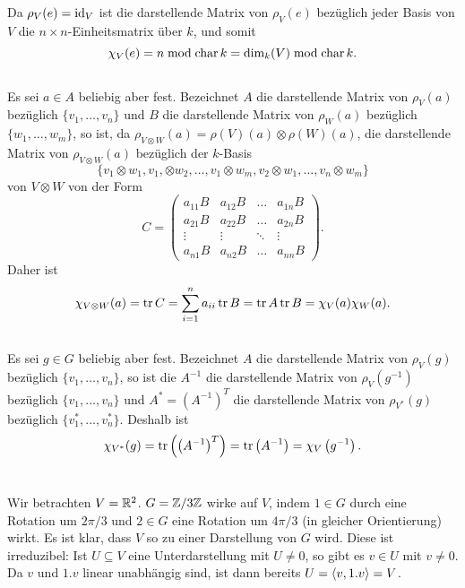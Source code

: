 \documentclass[a4paper,10pt]{article}
\begin{document}
\subsection{}
Da $\rho_V(e) = \operatorname{id}_V$ ist die darstellende Matrix von $\rho_V(e)$ bezüglich jeder Basis von $V$ die $n \times n$-Einheitsmatrix über $k$, und somit
\[
 \chi_V(e) = n \bmod \operatorname{char} k = \dim_k(V) \bmod \operatorname{char} k.
\]



\subsection{}
Es sei $a \in A$ beliebig aber fest. Bezeichnet $A$ die darstellende Matrix von $\rho_V(a)$ bezüglich $\{v_1, \ldots, v_n\}$ und $B$ die darstellende Matrix von $\rho_W(a)$ bezüglich $\{w_1, \ldots, w_m\}$, so ist, da $\rho_{V \otimes W}(a) = \rho(V)(a) \otimes \rho(W)(a)$, die darstellende Matrix von $\rho_{V \otimes W}(a)$ bezüglich der $k$-Basis
\[
 \{v_1 \otimes w_1, v_1, \otimes w_2, \ldots, v_1 \otimes  w_m, v_2 \otimes w_1, \ldots, v_n \otimes w_m\}
\]
von $V \otimes W$ von der Form
\[
 C =
 \begin{pmatrix}
  a_{11} B & a_{12} B & \ldots & a_{1n} B \\
  a_{21} B & a_{22} B & \ldots & a_{2n} B \\
    \vdots &   \vdots & \ddots &   \vdots \\
  a_{n1} B & a_{n2} B & \ldots & a_{nn} B
 \end{pmatrix}.
\]
Daher ist
\[
 \chi_{V \otimes W}(a) = \operatorname{tr} C = \sum_{i=1}^n a_{ii} \operatorname{tr}{B} = \operatorname{tr} A \operatorname{tr} B = \chi_V(a) \chi_W(a).
\]



\subsection{}
Es sei $g \in G$ beliebig aber fest. Bezeichnet $A$ die darstellende Matrix von $\rho_V(g)$ bezüglich $\{v_1, \ldots, v_n\}$, so ist die $A^{-1}$ die darstellende Matrix von $\rho_V\left(g^{-1}\right)$ bezüglich $\{v_1, \ldots, v_n\}$ und $A^* = (A^{-1})^T$ die darstellende Matrix von $\rho_{V^*}(g)$ bezüglich $\{v_1^*, \ldots, v_n^*\}$. Deshalb ist
\[
 \chi_{V^*}(g) = \operatorname{tr}\left(\left(A^{-1}\right)^T\right) = \operatorname{tr}\left( A^{-1} \right) = \chi_V\left(g^{-1}\right).
\]





\section{}


\subsection{}
Wir betrachten $V = \mathbb{R}^2$. $G = \mathbb{Z}/3\mathbb{Z}$ wirke auf $V$, indem $1 \in G$ durch eine Rotation um $2\pi/3$ und $2 \in G$ eine Rotation um $4\pi/3$ (in gleicher Orientierung) wirkt. Es ist klar, dass $V$ so zu einer Darstellung von $G$ wird. Diese ist irreduzibel: Ist $U \subseteq V$ eine Unterdarstellung mit $U \neq 0$, so gibt es $v \in U$ mit $v \neq 0$. Da $v$ und $1.v$ linear unabhängig sind, ist dann bereits $U = \left\langle v,1.v \right\rangle = V$.
\end{document}
